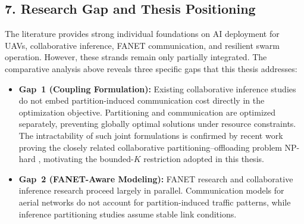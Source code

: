 \subsection*{7. Research Gap and Thesis Positioning}
The literature provides strong individual foundations on AI deployment for UAVs, collaborative inference, FANET communication, and resilient swarm operation. However, these strands remain only partially integrated. The comparative analysis above reveals three specific gaps that this thesis addresses:

\begin{itemize}
  \item \textbf{Gap~1 (Coupling Formulation):} Existing collaborative inference studies do not embed partition-induced communication cost directly in the optimization objective. Partitioning and communication are optimized separately, preventing globally optimal solutions under resource constraints. The intractability of such joint formulations is confirmed by recent work proving the closely related collaborative partitioning--offloading problem NP-hard \cite{cdpo2024}, motivating the bounded-$K$ restriction adopted in this thesis.

  \item \textbf{Gap~2 (FANET-Aware Modeling):} FANET research and collaborative inference research proceed largely in parallel. Communication models for aerial networks do not account for partition-induced traffic patterns, while inference partitioning studies assume stable link conditions.


\end{itemize}
